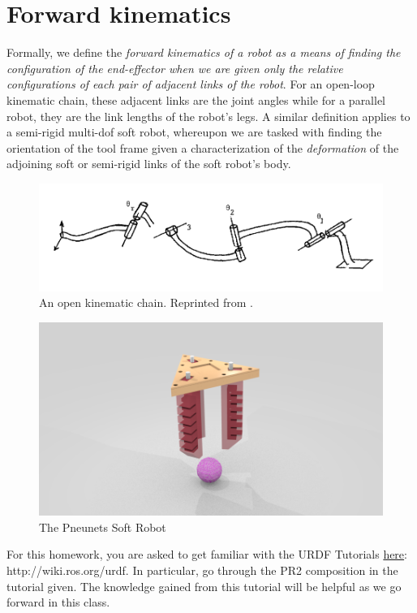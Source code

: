 \section{Forward kinematics}
%
Formally, we define the \textit{forward kinematics of a robot as a means of finding the configuration of the end-effector when we are given only the relative configurations of each pair of adjacent links of the robot}. For an open-loop kinematic chain, these adjacent links are the joint angles while for a parallel robot, they are the link lengths of the robot's legs. A similar definition applies to a semi-rigid multi-dof soft robot, whereupon we are tasked with finding the orientation of the tool frame given a characterization of the \textit{deformation} of the adjoining soft or semi-rigid links of the soft robot's body. 
%
\begin{figure}[tb!]
	\centering
	\includegraphics[width=.8\columnwidth]{figures/manip.png}
	\caption{An open kinematic chain. Reprinted from \cite{Brockett1990}.}
	\label{fig:manip}
\end{figure}
%
\begin{figure}[tb!]
	\centering
	\includegraphics[width=.8\columnwidth]{figures/pneunets.png}
	\caption{The Pneunets Soft Robot}
	\label{fig:pneunets}
\end{figure}
%


\begin{homework}
	For this homework, you are asked to get familiar with the URDF Tutorials \href{http://wiki.ros.org/urdf}{here}: http://wiki.ros.org/urdf. In particular, go through the PR2 composition in the tutorial given. The knowledge gained from this tutorial will be helpful as we go forward in this class.
\end{homework}

